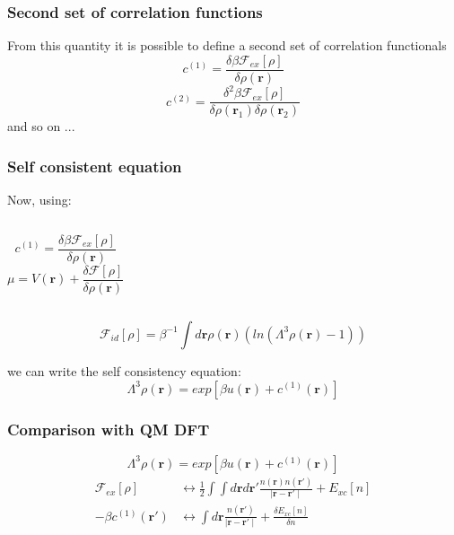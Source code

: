 \documentclass[12pt,notes=off,unicode]{beamer}
\begin{document}
  \begin{frame}[c]\frametitle{Second set of correlation functions}
    From this quantity it is possible to define a second set of correlation functionals
    \begin{equation}
      c^{(1)}= \frac{\delta \beta \mathcal{F}_{ex}[\rho]}{\delta \rho (\mathbf{r})}
    \end{equation}
    \begin{equation}
      c^{(2)}= \frac{\delta^2 \beta \mathcal{F}_{ex}[\rho]}{\delta \rho (\mathbf{r}_1) \delta \rho (\mathbf{r}_2)}
  \end{equation}
  and so on ...
  \end{frame}

  \begin{frame}[c]\frametitle{Self consistent equation}
  Now, using:

  \begin{columns}
    \begin{equation*}
      c^{(1)}= \frac{\delta \beta \mathcal{F}_{ex}[\rho]}{\delta \rho (\mathbf{r})}
    \end{equation*}
    \begin{equation*}
      \mu = V(\mathbf{r}) + \frac{\delta \mathcal{F}[\rho]}{\delta\rho(\mathbf{r})}
    \end{equation*}
  \end{columns}
  
  \begin{equation*}
    \mathcal{F}_{id}[\rho] = \beta^{-1} \int d \mathbf{r} \rho(\mathbf{r})
    (ln(\Lambda^3 \rho(\mathbf{r})-1))
  \end{equation*}

  we can write the self consistency equation:
  \begin{equation}
    \Lambda^3 \rho(\mathbf{r}) = exp \left[\beta u(\mathbf{r}) + c^{(1)}(\mathbf{r})\right]
  \end{equation} 
  \end{frame}

  \begin{frame}[c]\frametitle{Comparison with QM DFT}
  \begin{equation*}
    \Lambda^3 \rho(\mathbf{r}) = exp \left[\beta u(\mathbf{r}) + c^{(1)}(\mathbf{r})\right]
  \end{equation*} 
    \begin{align*}
      \mathcal{F}_{ex}[\rho] &\leftrightarrow \frac{1}{2} \int \int d \mathbf{r} d \mathbf{r'}\frac{n(\mathbf{r})n(\mathbf{r'})}{\mid \mathbf{r} - \mathbf{r'} \mid} + E_{xc}[n]\\
      -\beta c^{(1)}(\mathbf{r'}) &\leftrightarrow \int d \mathbf{r} \frac{n(\mathbf{r'})}{\mid \mathbf{r} - \mathbf{r'} \mid} + \frac{\delta E_{xc}[n]}{\delta n}
    \end{align*}
  \end{frame}
\end{document}
